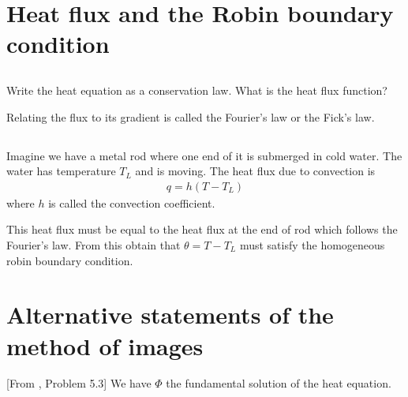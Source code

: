 \documentclass[11pt,letterpaper]{article}
\begin{document}
\section{Heat flux and the Robin boundary condition}
\subsection{}
Write the heat equation as a conservation law. What is the heat flux function? 

Relating the flux to its gradient is called the Fourier's law or the Fick's law.

\subsection{}
Imagine we have a metal rod where one end of it is submerged in cold water. The water has temperature $T_L$ and is moving. The heat flux due to convection is
\begin{align}
    q = h(T-T_L)
\end{align}
where $h$ is called the convection coefficient.

This heat flux must be equal to the heat flux at the end of rod which follows the Fourier's law. From this obtain that $\theta = T-T_L$ must satisfy the homogeneous robin boundary condition.




\section{Alternative statements of the method of images}
[From \cite{ShearerLevy_15}, Problem 5.3] We have $\Phi$ the fundamental solution of the heat equation.
\end{document}
